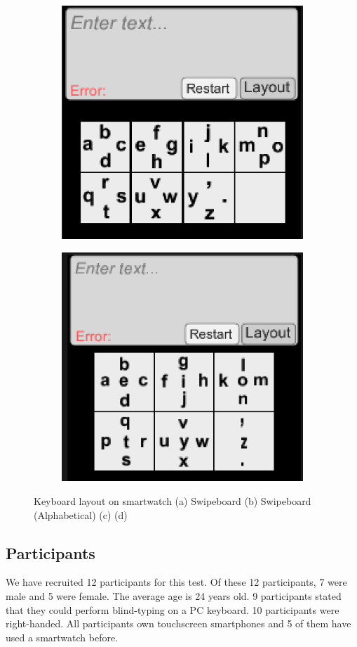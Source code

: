 \begin{figure}
\begin{subfigure}{.24\textwidth}
  \includegraphics[width=.8\linewidth]{figures/F8-3.png}
  \caption{}
  \label{fig:f8c}
\end{subfigure}
\begin{subfigure}{.24\textwidth}
  \centering
  \includegraphics[width=.8\linewidth]{figures/F8-4.png}
  \caption{}
  \label{fig:f8d}
\end{subfigure}
\caption{Keyboard layout on smartwatch (a) Swipeboard (b) Swipeboard (Alphabetical) (c)  (d) }
\label{fig:f8}
\end{figure}

\subsection{Participants}
We have recruited 12 participants for this test. Of these 12 participants, 7 were male and 5 were female. The average age is 24 years old. 9 participants stated that they could perform blind-typing on a PC keyboard. 10 participants were right-handed. All participants own touchscreen smartphones and 5 of them have used a smartwatch before.

